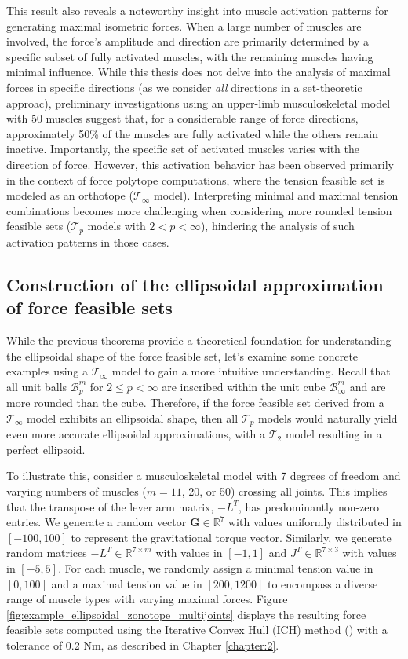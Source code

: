 This result also reveals a noteworthy insight into muscle activation patterns for generating maximal isometric forces. When a large number of muscles are involved, the force's amplitude and direction are primarily determined by a specific subset of fully activated muscles, with the remaining muscles having minimal influence. While this thesis does not delve into the analysis of maximal forces in specific directions (as we consider \emph{all} directions in a set-theoretic approac), preliminary investigations using an upper-limb musculoskeletal model with 50 muscles suggest that, for a considerable range of force directions, approximately 50\% of the muscles are fully activated while the others remain inactive. Importantly, the specific set of activated muscles varies with the direction of force. However, this activation behavior has been observed primarily in the context of force polytope computations, where the tension feasible set is modeled as an orthotope ($\mathcal{T}_\infty$ model). Interpreting minimal and maximal tension combinations becomes more challenging when considering more rounded tension feasible sets ($\mathcal{T}_p$ models with $2 < p < \infty$), hindering the analysis of such activation patterns in those cases.

\subsection{Construction of the ellipsoidal approximation of force feasible sets}
\label{subsec:ellipsoidal_approx_in_practice}
While the previous theorems provide a theoretical foundation for understanding the ellipsoidal shape of the force feasible set, let's examine some concrete examples using a $\mathcal{T}_{\infty}$ model to gain a more intuitive understanding. Recall that all unit balls $\mathcal{B}_p^m$ for $2 \leq p < \infty$ are inscribed within the unit cube $\mathcal{B}_{\infty}^m$ and are more rounded than the cube. Therefore, if the force feasible set derived from a $\mathcal{T}_{\infty}$ model exhibits an ellipsoidal shape, then all $\mathcal{T}_p$ models would naturally yield even more accurate ellipsoidal approximations, with a $\mathcal{T}_2$ model resulting in a perfect ellipsoid.

To illustrate this, consider a musculoskeletal model with 7 degrees of freedom and varying numbers of muscles ($m = 11$, 20, or 50) crossing all joints. This implies that the transpose of the lever arm matrix, $-L^T$, has predominantly non-zero entries. We generate a random vector $\mathbf{G} \in \mathbb{R}^7$ with values uniformly distributed in $[-100, 100]$ to represent the gravitational torque vector. Similarly, we generate random matrices $-L^T \in \mathbb{R}^{7 \times m}$ with values in $[-1, 1]$ and $J^T \in \mathbb{R}^{7 \times 3}$ with values in $[-5, 5]$. For each muscle, we randomly assign a minimal tension value in $[0, 100]$ and a maximal tension value in $[200, 1200]$ to encompass a diverse range of muscle types with varying maximal forces. Figure \ref{fig:example_ellipsoidal_zonotope_multijoints} displays the resulting force feasible sets computed using the Iterative Convex Hull (ICH) method (\cite{skuricOnLineFeasibleWrench2022}) with a tolerance of 0.2 Nm, as described in Chapter \ref{chapter:2}.

